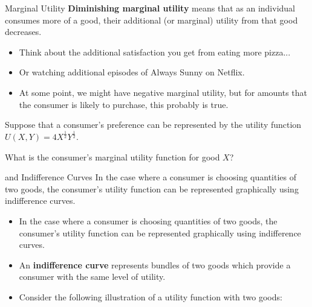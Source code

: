 \documentclass[11pt,t]{beamer}
\begin{document}
\begin{frame}{Marginal Utility}
  \textbf{Diminishing marginal utility} means that as an individual consumes more of a good, their additional (or marginal) utility from that good decreases.

  \begin{itemize}
    \item Think about the additional satisfaction you get from eating more pizza...

    \item Or watching additional episodes of Always Sunny on Netflix.

    \pause
    \item At some point, we might have negative marginal utility, but for amounts that the consumer is likely to purchase, this probably is true.
  \end{itemize}
\end{frame}

\begin{frame}

  \bigskip
  Suppose that a consumer's preference can be represented by the utility function $U(X,Y) = 4X^\frac{1}{2} Y^\frac{1}{2}$. 
  
  What is the consumer's marginal utility function for good $X$?
\end{frame}

\begin{frame}{ and Indifference Curves}
  In the case where a consumer is choosing quantities of two goods, the consumer's utility function can be represented graphically using indifference curves.

  \begin{itemize}
    \item In the case where a consumer is choosing quantities of two goods, the consumer's utility function can be represented graphically using indifference curves.

    \item An \textbf{indifference curve} represents bundles of two goods which provide a consumer with the same level of utility.

    \item Consider the following illustration of a utility function with two goods: 
  \end{itemize}
\end{frame}
\end{document}
